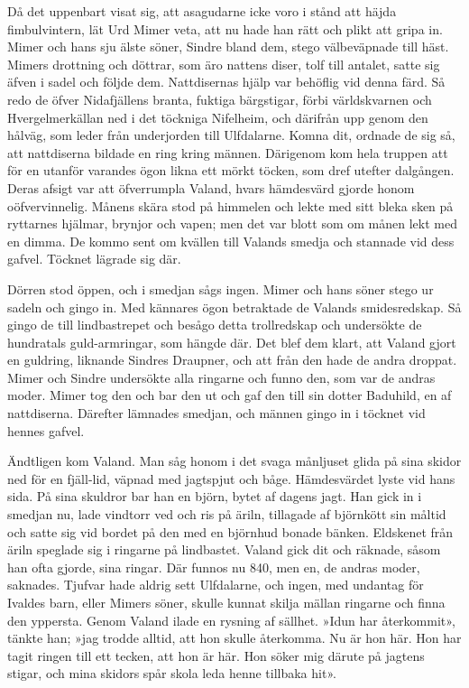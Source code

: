 Då det uppenbart visat sig, att asagudarne icke voro i stånd att häjda
fimbulvintern, lät Urd Mimer veta, att nu hade han rätt och plikt att
gripa in. Mimer och hans sju älste söner, Sindre bland dem, stego
välbeväpnade till häst. Mimers drottning och döttrar, som äro nattens
diser, tolf till antalet, satte sig äfven i sadel och följde dem.
Nattdisernas hjälp var behöflig vid denna färd. Så redo de öfver
Nidafjällens branta, fuktiga bärgstigar, förbi världskvarnen och
Hvergelmerkällan ned i det töckniga Nifelheim, och därifrån upp genom
den hålväg, som leder från underjorden till Ulfdalarne. Komna dit,
ordnade de sig så, att nattdiserna bildade en ring kring männen.
Därigenom kom hela truppen att för en utanför varandes ögon likna ett
mörkt töcken, som dref utefter dalgången. Deras afsigt var att
öfverrumpla Valand, hvars hämdesvärd gjorde honom oöfvervinnelig. Månens
skära stod på himmelen och lekte med sitt bleka sken på ryttarnes
hjälmar, brynjor och vapen; men det var blott som om månen lekt med en
dimma. De kommo sent om kvällen till Valands smedja och stannade vid
dess gafvel. Töcknet lägrade sig där.

\protect\hypertarget{lb1625905.xhtmlux5cux23start99}{}{}\protect\hypertarget{lb1625905.xhtmlux5cux23start99-a}{}{}\protect\hypertarget{lb1625905.xhtmlux5cux23start99-b}{}{}\protect\hypertarget{lb1625905.xhtmlux5cux23start99-c}{}{}\protect\hypertarget{lb1625905.xhtmlux5cux23start99-d}{}{}

Dörren stod öppen, och i smedjan sågs ingen. Mimer och hans söner stego
ur sadeln och gingo in. Med kännares ögon betraktade de Valands
smidesredskap. Så gingo de till lindbastrepet och besågo detta
trollredskap och undersökte de hundratals guld-armringar, som hängde
där. Det blef dem klart, att Valand gjort en guldring, liknande Sindres
Draupner, och att från den hade de andra droppat. Mimer och Sindre
undersökte alla ringarne och funno den, som var de andras moder. Mimer
tog den och bar den ut och gaf den till sin dotter Baduhild, en af
nattdiserna. Därefter lämnades smedjan, och männen gingo in i töcknet
vid hennes gafvel.

Ändtligen kom Valand. Man såg honom i det svaga månljuset glida på sina
skidor ned för en fjäll-lid, väpnad med jagtspjut och båge. Hämdesvärdet
lyste vid hans sida. På sina skuldror bar han en björn, bytet af dagens
jagt. Han gick in i smedjan nu, lade vindtorr ved och ris på äriln,
tillagade af björnkött sin måltid och satte sig vid bordet på den med en
björnhud bonade bänken. Eldskenet från äriln speglade sig i ringarne på
lindbastet. Valand gick dit och räknade, såsom han ofta gjorde, sina
ringar. Där funnos nu 840, men en, de andras moder, saknades. Tjufvar
hade aldrig sett Ulfdalarne, och ingen, med undantag för Ivaldes barn,
eller Mimers söner, skulle kunnat skilja mällan ringarne och finna den
yppersta. Genom Valand ilade en rysning af sällhet. »Idun har
återkommit», tänkte han; »jag trodde alltid, att hon skulle återkomma.
Nu är hon här. Hon har tagit ringen till ett tecken, att hon är här. Hon
söker mig därute på jagtens stigar, och mina skidors spår skola leda
henne tillbaka hit».


